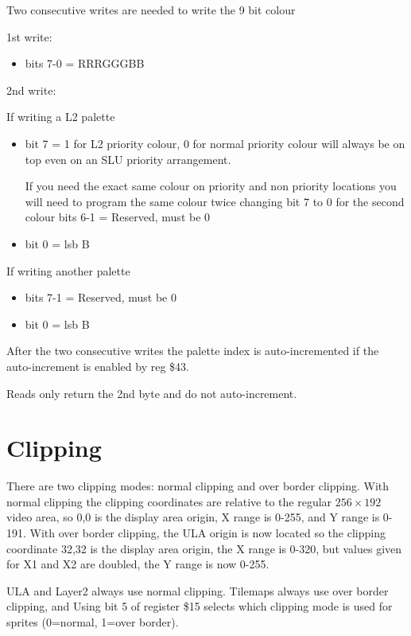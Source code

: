 Two consecutive writes are needed to write the 9 bit colour

1st write:

\begin{itemize}
\item bits 7-0 = RRRGGGBB
\end{itemize}

2nd write: 

If writing a L2 palette

\hrulefill
\begin{itemize}
\item bit 7 = 1 for L2 priority colour, 0 for normal priority colour will always be on top even on an SLU priority arrangement. 

If you need the exact same colour on priority and non priority
locations you will need to program the same colour twice changing bit
7 to 0 for the second colour bits 6-1 = Reserved, must be 0

\item bit 0 = lsb B
\end{itemize}
     
If writing another palette

\hrulefill
\begin{itemize}
\item bits 7-1 = Reserved, must be 0
\item bit 0 = lsb B
\end{itemize}           
After the two consecutive writes the palette index is auto-incremented
if the auto-increment is enabled by reg \$43.
     
Reads only return the 2nd byte and do not auto-increment.

\section{Clipping}

There are two clipping modes: normal clipping and over border
clipping. With normal clipping the clipping coordinates are relative
to the regular $256\times192$ video area, so 0,0 is the display area origin,
X range is 0-255, and Y range is 0-191. With over border clipping, the
ULA origin is now located so the clipping coordinate 32,32 is the
display area origin, the X range is 0-320, but values given for X1 and
X2 are doubled, the Y range is now 0-255.

ULA and Layer2 always use normal clipping.  Tilemaps always use over
border clipping, and Using bit 5 of register \$15 selects which
clipping mode is used for sprites (0=normal, 1=over border).

